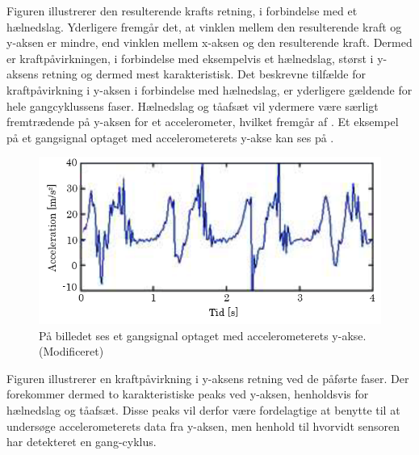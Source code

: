 Figuren illustrerer den resulterende krafts retning, i forbindelse med et hælnedslag. Yderligere fremgår det, at vinklen mellem den resulterende kraft og y-aksen er mindre, end vinklen mellem x-aksen og den resulterende kraft. Dermed er kraftpåvirkningen, i forbindelse med eksempelvis et hælnedslag, størst i y-aksens retning og dermed mest karakteristisk. \newline
Det beskrevne tilfælde for kraftpåvirkning i y-aksen i forbindelse med hælnedslag, er yderligere gældende for hele gangcyklussens faser. \citep{Rueterbories2010,Serway2010,ClelandKikhia2013} \newline
Hælnedslag og tåafsæt vil ydermere være særligt fremtrædende på y-aksen for et accelerometer, hvilket fremgår af . Et eksempel på et gangsignal optaget med accelerometerets y-akse kan ses på . 

\begin{figure}[H]
	\centering
	\includegraphics[scale=0.7]{figures/bProblemloesning/gang_y_acc.png}
	\caption{På billedet ses et gangsignal optaget med accelerometerets y-akse. \citep{ClelandKikhia2013} (Modificeret)}
	\label{fig:gang_y_acc}
\end{figure}

Figuren illustrerer en kraftpåvirkning i y-aksens retning ved de påførte faser. Der forekommer dermed to karakteristiske peaks ved y-aksen, henholdsvis for hælnedslag og tåafsæt. Disse peaks vil derfor være fordelagtige at benytte til at undersøge accelerometerets data fra y-aksen, men henhold til hvorvidt sensoren har detekteret en gang-cyklus. 

